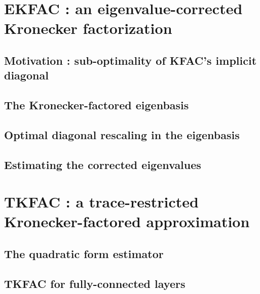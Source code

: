 \documentclass[11pt]{report}
\numberwithin{equation}{chapter}
\theoremstyle{plain}
\theoremstyle{remark}
\begin{document}
\section{EKFAC : an eigenvalue-corrected Kronecker factorization}
\mbox{}\par

\subsection{Motivation : sub-optimality of KFAC's implicit diagonal}
\mbox{}\par

\subsection{The Kronecker-factored eigenbasis}
\mbox{}\par

\subsection{Optimal diagonal rescaling in the eigenbasis}
\mbox{}\par

\subsection{Estimating the corrected eigenvalues}
\mbox{}\par

\section{TKFAC : a trace-restricted Kronecker-factored approximation}
\mbox{}\par

\subsection{The quadratic form estimator}
\mbox{}\par

\subsection{TKFAC for fully-connected layers}
\mbox{}\par
\end{document}
